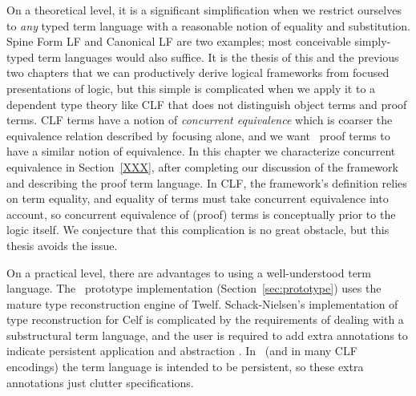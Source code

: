 On a theoretical level, it is a significant simplification when we
restrict ourselves to {\it any} typed term language with a reasonable
notion of equality and substitution. Spine Form LF and Canonical LF
are two examples; most conceivable simply-typed term languages would
also suffice. It is the thesis of this and the previous two chapters
that we can productively derive logical frameworks from focused
presentations of logic, but this simple is complicated when we apply it
to a dependent type theory like CLF that does not distinguish object
terms and proof terms. CLF terms have a notion of {\it concurrent
  equivalence} which is coarser the equivalence relation described by
focusing alone, and we want \sls~proof terms to have a similar notion
of equivalence. In this chapter we characterize concurrent equivalence
in Section~\ref{XXX}, after completing our discussion of the framework
and describing the proof term language.  In CLF, the framework's
definition relies on term equality, and equality of terms must take
concurrent equivalence into account, so concurrent equivalence of
(proof) terms is conceptually prior to the logic itself. We conjecture
that this complication is no great obstacle, but this thesis avoids
the issue.

On a practical level, there are advantages to using a well-understood
term language. The \sls~prototype implementation
(Section~\ref{sec:prototype}) uses the mature type reconstruction
engine of Twelf. Schack-Nielsen's implementation of type
reconstruction for Celf is complicated by the requirements of dealing
with a substructural term language, and the user is required to add
extra annotations to indicate persistent application and abstraction
\cite{schacknielsen08celf}. In \sls~(and in many CLF encodings) the
term language is intended to be persistent, so these extra annotations
just clutter specifications.

